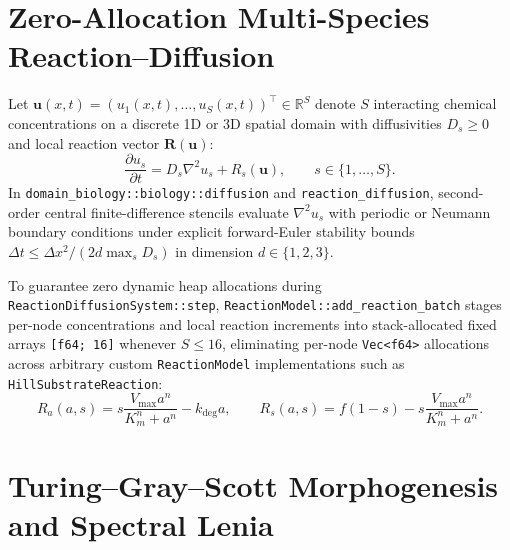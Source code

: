 \documentclass[12pt]{article}
\begin{document}
\section{Zero-Allocation Multi-Species Reaction--Diffusion}

Let $\mathbf{u}(x, t) = (u_1(x, t), \dots, u_S(x, t))^\top \in \mathbb{R}^S$ denote $S$ interacting chemical concentrations on a discrete 1D or 3D spatial domain with diffusivities $D_s \ge 0$ and local reaction vector $\mathbf{R}(\mathbf{u})$:
\begin{equation}
\frac{\partial u_s}{\partial t} = D_s \nabla^2 u_s + R_s(\mathbf{u}), \qquad s \in \{1, \dots, S\}.
\label{eq:reaction_diffusion}
\end{equation}
In \texttt{domain\_biology::biology::diffusion} and \texttt{reaction\_diffusion}, second-order central finite-difference stencils evaluate $\nabla^2 u_s$ with periodic or Neumann boundary conditions under explicit forward-Euler stability bounds $\Delta t \le \Delta x^2 / (2 d \max_s D_s)$ in dimension $d \in \{1, 2, 3\}$.

To guarantee zero dynamic heap allocations during \texttt{ReactionDiffusionSystem::step}, \texttt{ReactionModel::add\_reaction\_batch} stages per-node concentrations and local reaction increments into stack-allocated fixed arrays \texttt{[f64; 16]} whenever $S \le 16$, eliminating per-node \texttt{Vec<f64>} allocations across arbitrary custom \texttt{ReactionModel} implementations such as \texttt{HillSubstrateReaction}:
\begin{equation}
R_a(a, s) = s \frac{V_{\max} a^n}{K_m^n + a^n} - k_{\text{deg}} a, \qquad
R_s(a, s) = f (1 - s) - s \frac{V_{\max} a^n}{K_m^n + a^n}.
\end{equation}

\section{Turing--Gray--Scott Morphogenesis and Spectral Lenia}
\end{document}
